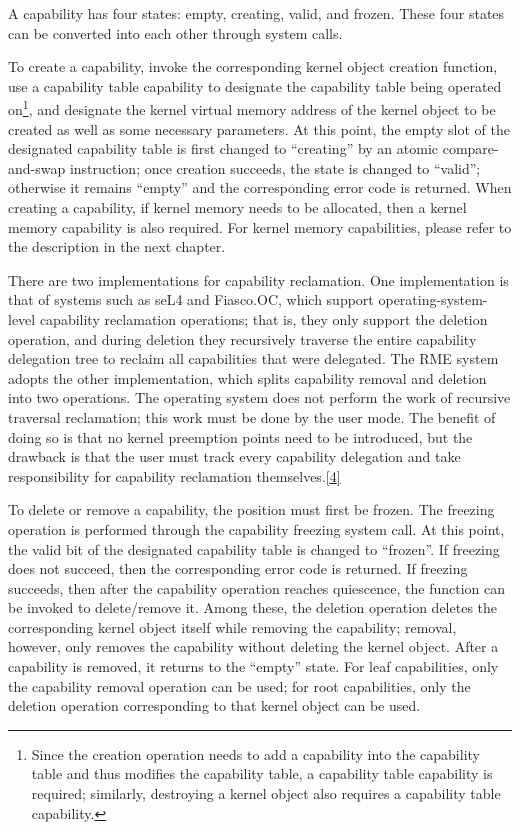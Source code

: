 A capability has four states: empty, creating, valid, and frozen. These four states can be converted into each other through system calls.

To create a capability, invoke the corresponding kernel object creation function, use a capability table capability to designate the capability table being operated on\footnote{Since the creation operation needs to add a capability into the capability table and thus modifies the capability table, a capability table capability is required; similarly, destroying a kernel object also requires a capability table capability.}, and designate the kernel virtual memory address of the kernel object to be created as well as some necessary parameters. At this point, the empty slot of the designated capability table is first changed to ``creating'' by an atomic compare-and-swap instruction; once creation succeeds, the state is changed to ``valid''; otherwise it remains ``empty'' and the corresponding error code is returned. When creating a capability, if kernel memory needs to be allocated, then a kernel memory capability is also required. For kernel memory capabilities, please refer to the description in the next chapter.

There are two implementations for capability reclamation. One implementation is that of systems such as seL4 and Fiasco.OC, which support operating-system-level capability reclamation operations; that is, they only support the deletion operation, and during deletion they recursively traverse the entire capability delegation tree to reclaim all capabilities that were delegated. The RME system adopts the other implementation, which splits capability removal and deletion into two operations. The operating system does not perform the work of recursive traversal reclamation; this work must be done by the user mode. The benefit of doing so is that no kernel preemption points need to be introduced, but the drawback is that the user must track every capability delegation and take responsibility for capability reclamation themselves.\hyperref[cite:2-4]{{[}4{]}}

To delete or remove a capability, the position must first be frozen. The freezing operation is performed through the capability freezing system call. At this point, the valid bit of the designated capability table is changed to ``frozen''. If freezing does not succeed, then the corresponding error code is returned. If freezing succeeds, then after the capability operation reaches quiescence, the function can be invoked to delete/remove it. Among these, the deletion operation deletes the corresponding kernel object itself while removing the capability; removal, however, only removes the capability without deleting the kernel object. After a capability is removed, it returns to the ``empty'' state. For leaf capabilities, only the capability removal operation can be used; for root capabilities, only the deletion operation corresponding to that kernel object can be used.

